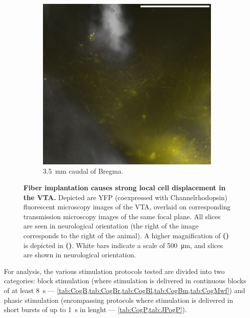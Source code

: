 \begin{figure}[h!]
\begin{subfigure}{.43\textwidth}
		\label{fig:h6589}
	\end{subfigure}
	\begin{subfigure}{.2728\textwidth}
		\centering
		\includegraphics[width=\textwidth]{img/sub-6589_slice-a4_zoom-10_scene-2_transmission-yfp-comb_straight.png}
                \caption{\SI{3.5}{\milli\meter} caudal of Bregma.}
		\label{fig:h6589z}
	\end{subfigure}
        \vspace{-.5em}
	\caption{
		\textbf{Fiber implantation causes strong local cell displacement in the VTA.}
                Depicted are YFP (coexpressed with Channelrhodopsin) fluorescent microscopy images of the VTA, overlaid on corresponding transmission microscopy images of the same focal plane.
                All slices are seen in neurological orientation (the right of the image corresponds to the right of the animal).
                A higher magnification of \textbf{()} is depicted in \textbf{()}.
                White bars indicate a scale of \SI{500}{\micro\meter}, and slices are shown in neurological orientation.
                }
	\label{fig:h}
\end{figure}

For analysis, the various stimulation protocols tested are divided into two categories:
block stimulation (where stimulation is delivered in continuous blocks of at least \SI{8}{\second} --- \cref{tab:CogB,tab:CogBr,tab:CogBl,tab:CogBm,tab:CogMwf})
and
phasic stimulation (encompassing protocols where stimulation is delivered in short bursts of up to \SI{1}{\second} in lenght --- \cref{tab:CogP,tab:JPogP}).


